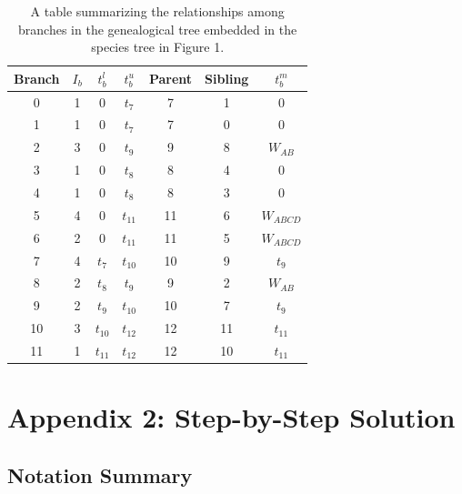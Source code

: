 \documentclass[11pt]{article}
\begin{document}
\begin{table}[h]
\centering
\caption{\label{tab:table-2} 
	A table summarizing the relationships among branches in the genealogical tree embedded in the species tree in Figure 1. 
}
\begin{tabular}[t]{ |c|c|c|c|c|c|c| }
	\toprule
	Branch & $I_b$ & $t_b^l$ & $t_b^u$ & Parent & Sibling & $t_b^m$ \\
	\midrule
	0  &  1 & 0      & $t_7$  & 7  & 1  & 0          \\
	1  &  1 & 0      & $t_7$  & 7  & 0  & 0          \\
	2  &  3 & 0      & $t_9$  & 9  & 8  & $W_{AB}$   \\
	3  &  1 & 0      & $t_8$  & 8  & 4  & 0          \\
	4  &  1 & 0      & $t_8$  & 8  & 3  & 0          \\
	5  &  4 & 0      & $t_{11}$ & 11 & 6  & $W_{ABCD}$ \\
	6  &  2 & 0      & $t_{11}$ & 11 & 5  & $W_{ABCD}$ \\
	7  &  4 & $t_7$  & $t_{10}$ & 10 & 9  & $t_9$      \\
	8  &  2 & $t_8$  & $t_9$  & 9  & 2  & $W_{AB}$   \\
	9  &  2 & $t_9$  & $t_{10}$ & 10 & 7  & $t_9$      \\
	10 &  3 & $t_{10}$ & $t_{12}$ & 12 & 11 & $t_{11}$     \\
	11 &  1 & $t_{11}$ & $t_{12}$ & 12 & 10 & $t_{11}$     \\
	\bottomrule
\end{tabular}
\end{table}

\section{Appendix 2: Step-by-Step Solution}


\subsection{Notation Summary}
\end{document}
